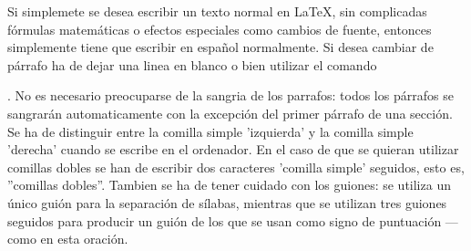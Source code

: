 \documentclass[a4paper,10pt]{letter}
\begin{document}
Si simplemete se desea escribir un texto normal en LaTeX,
sin complicadas fórmulas matemáticas o efectos especiales
como cambios de fuente, entonces simplemente tiene que escribir
en español normalmente.
Si desea cambiar de párrafo ha de dejar una linea en blanco o bien
utilizar el comando \par.
No es necesario preocuparse de la sangria de los parrafos:
todos los párrafos se sangrarán automaticamente con la excepción
del primer párrafo de una sección.
Se ha de distinguir entre la comilla simple 'izquierda'
y la comilla simple 'derecha' cuando se escribe en el ordenador.
En el caso de que se quieran utilizar comillas dobles se han de
escribir dos caracteres 'comilla simple' seguidos, esto es,
''comillas dobles''.
Tambien se ha de tener cuidado con los guiones: se utiliza un único
guión para la separación de sílabas, mientras que se utilizan
tres guiones seguidos para producir un guión de los que se usan
como signo de puntuación --- como en esta oración.
\end{document}
